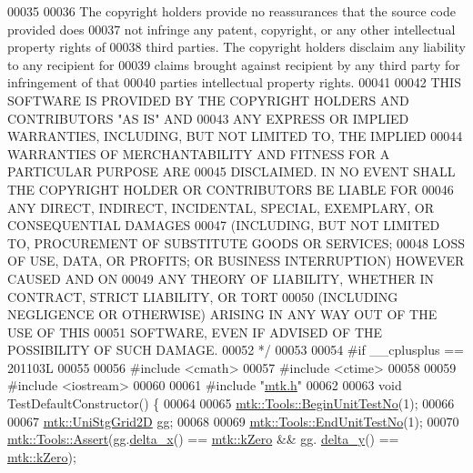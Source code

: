 \begin{DoxyCode}
00035 \textcolor{comment}{}
00036 \textcolor{comment}{The copyright holders provide no reassurances that the source code provided does}
00037 \textcolor{comment}{not infringe any patent, copyright, or any other intellectual property rights of}
00038 \textcolor{comment}{third parties. The copyright holders disclaim any liability to any recipient for}
00039 \textcolor{comment}{claims brought against recipient by any third party for infringement of that}
00040 \textcolor{comment}{parties intellectual property rights.}
00041 \textcolor{comment}{}
00042 \textcolor{comment}{THIS SOFTWARE IS PROVIDED BY THE COPYRIGHT HOLDERS AND CONTRIBUTORS "AS IS" AND}
00043 \textcolor{comment}{ANY EXPRESS OR IMPLIED WARRANTIES, INCLUDING, BUT NOT LIMITED TO, THE IMPLIED}
00044 \textcolor{comment}{WARRANTIES OF MERCHANTABILITY AND FITNESS FOR A PARTICULAR PURPOSE ARE}
00045 \textcolor{comment}{DISCLAIMED. IN NO EVENT SHALL THE COPYRIGHT HOLDER OR CONTRIBUTORS BE LIABLE FOR}
00046 \textcolor{comment}{ANY DIRECT, INDIRECT, INCIDENTAL, SPECIAL, EXEMPLARY, OR CONSEQUENTIAL DAMAGES}
00047 \textcolor{comment}{(INCLUDING, BUT NOT LIMITED TO, PROCUREMENT OF SUBSTITUTE GOODS OR SERVICES;}
00048 \textcolor{comment}{LOSS OF USE, DATA, OR PROFITS; OR BUSINESS INTERRUPTION) HOWEVER CAUSED AND ON}
00049 \textcolor{comment}{ANY THEORY OF LIABILITY, WHETHER IN CONTRACT, STRICT LIABILITY, OR TORT}
00050 \textcolor{comment}{(INCLUDING NEGLIGENCE OR OTHERWISE) ARISING IN ANY WAY OUT OF THE USE OF THIS}
00051 \textcolor{comment}{SOFTWARE, EVEN IF ADVISED OF THE POSSIBILITY OF SUCH DAMAGE.}
00052 \textcolor{comment}{*/}
00053 
00054 \textcolor{preprocessor}{#if \_\_cplusplus == 201103L}
00055 
00056 \textcolor{preprocessor}{#include <cmath>}
00057 \textcolor{preprocessor}{#include <ctime>}
00058 
00059 \textcolor{preprocessor}{#include <iostream>}
00060 
00061 \textcolor{preprocessor}{#include "\hyperlink{mtk_8h}{mtk.h}"}
00062 
00063 \textcolor{keywordtype}{void} TestDefaultConstructor() \{
00064 
00065   \hyperlink{classmtk_1_1Tools_a26ee906d28523378522a75e25c3a4e19}{mtk::Tools::BeginUnitTestNo}(1);
00066 
00067   \hyperlink{classmtk_1_1UniStgGrid2D}{mtk::UniStgGrid2D} gg;
00068 
00069   \hyperlink{classmtk_1_1Tools_ad8cf0085133dd40c913fe195bc5b9694}{mtk::Tools::EndUnitTestNo}(1);
00070   \hyperlink{classmtk_1_1Tools_aa311fada9255627d06c56b1e4fedce9e}{mtk::Tools::Assert}(gg.\hyperlink{classmtk_1_1UniStgGrid2D_aca4710004c4a7da6a9e8fd6ab32a691f}{delta\_x}() == \hyperlink{group__c01-roots_ga59a451a5fae30d59649bcda274fea271}{mtk::kZero} && gg.
      \hyperlink{classmtk_1_1UniStgGrid2D_a65a78cfc80ffdbeb282ed57af4dc5cb4}{delta\_y}() == \hyperlink{group__c01-roots_ga59a451a5fae30d59649bcda274fea271}{mtk::kZero});

\end{DoxyCode}
